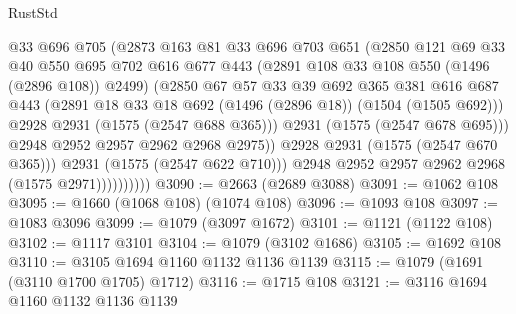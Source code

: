 \begin{lexlean}{RustStd}
\begin{coremodule}
                            @33
                            @696
                            @705
                            (@2873
                              @163
                              @81
                              @33
                              @696
                              @703
                              @651
                              (@2850
                                @121
                                @69
                                @33
                                @40
                                @550
                                @695
                                @702
                                @616
                                @677
                                @443
                                (@2891 @108 @33 @108 @550 (@1496 (@2896 @108)) @2499)
                                (@2850
                                  @67
                                  @57
                                  @33
                                  @39
                                  @692
                                  @365
                                  @381
                                  @616
                                  @687
                                  @443
                                  (@2891 @18 @33 @18 @692 (@1496 (@2896 @18)) (@1504 (@1505 @692)))
                                  @2928
                                  @2931
                                  (@1575 (@2547 @688 @365)))
                                @2931
                                (@1575 (@2547 @678 @695)))
                              @2948
                              @2952
                              @2957
                              @2962
                              @2968
                              @2975))
                          @2928
                          @2931
                          (@1575 (@2547 @670 @365)))
                        @2931
                        (@1575 (@2547 @622 @710)))
                      @2948
                      @2952
                      @2957
                      @2962
                      @2968
                      (@1575 @2971))))))))))
@3090 := @2663 (@2689 @3088)
@3091 := @1062 @108
@3095 := @1660 (@1068 @108) (@1074 @108)
@3096 := @1093 @108
@3097 := @1083 @3096
@3099 := @1079 (@3097 @1672)
@3101 := @1121 (@1122 @108)
@3102 := @1117 @3101
@3104 := @1079 (@3102 @1686)
@3105 := @1692 @108
@3110 := @3105 @1694 @1160 @1132 @1136 @1139
@3115 := @1079 (@1691 (@3110 @1700 @1705) @1712)
@3116 := @1715 @108
@3121 := @3116 @1694 @1160 @1132 @1136 @1139

\end{coremodule}
\end{lexlean}
